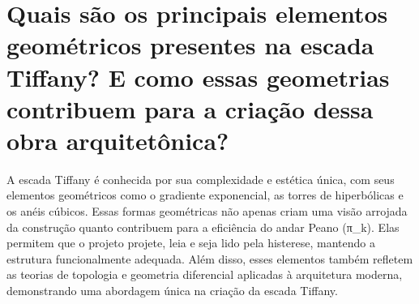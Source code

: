 \documentclass[11pt,a4paper]{article}
\begin{document}
\section{Quais são os principais elementos geométricos presentes na escada Tiffany? E como essas geometrias contribuem para a criação dessa obra arquitetônica?}
A escada Tiffany é conhecida por sua complexidade e estética única, com seus elementos geométricos como o gradiente exponencial, as torres de hiperbólicas e os anéis cúbicos. Essas formas geométricas não apenas criam uma visão arrojada da construção quanto contribuem para a eficiência do andar Peano (π\_k). Elas permitem que o projeto projete, leia e seja lido pela histerese, mantendo a estrutura funcionalmente adequada. Além disso, esses elementos também refletem as teorias de topologia e geometria diferencial aplicadas à arquitetura moderna, demonstrando uma abordagem única na criação da escada Tiffany.
\end{document}
